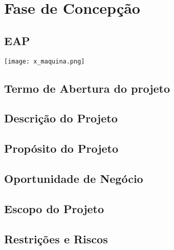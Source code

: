 \section{Fase de Concepção}
\subsection{EAP}
    \begin{center}
        \texttt{[image: x\_maquina.png]}
    \end{center}
\subsection{Termo de Abertura do projeto}
\subsection{Descrição do Projeto}
\subsection{Propósito do Projeto}
\subsection{Oportunidade de Negócio}
\subsection{Escopo do Projeto}
\subsection{Restrições e Riscos}
\subsection{}




